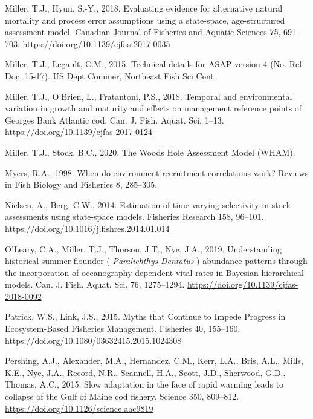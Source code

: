 \documentclass[]{article}
\begin{document}
\leavevmode\hypertarget{ref-miller2018Evaluating}{}%
Miller, T.J., Hyun, S.-Y., 2018. Evaluating evidence for alternative
natural mortality and process error assumptions using a state-space,
age-structured assessment model. Canadian Journal of Fisheries and
Aquatic Sciences 75, 691--703.
\url{https://doi.org/10.1139/cjfas-2017-0035}

\leavevmode\hypertarget{ref-miller2015Technical}{}%
Miller, T.J., Legault, C.M., 2015. Technical details for ASAP version 4
(No. Ref Doc. 15-17). US Dept Commer, Northeast Fish Sci Cent.

\leavevmode\hypertarget{ref-miller2018Temporal}{}%
Miller, T.J., O'Brien, L., Fratantoni, P.S., 2018. Temporal and
environmental variation in growth and maturity and effects on management
reference points of Georges Bank Atlantic cod. Can. J. Fish. Aquat. Sci.
1--13. \url{https://doi.org/10.1139/cjfas-2017-0124}

\leavevmode\hypertarget{ref-miller2020Woods}{}%
Miller, T.J., Stock, B.C., 2020. The Woods Hole Assessment Model (WHAM).

\leavevmode\hypertarget{ref-myers1998When}{}%
Myers, R.A., 1998. When do environment-recruitment correlations work?
Reviews in Fish Biology and Fisheries 8, 285--305.

\leavevmode\hypertarget{ref-nielsen2014Estimation}{}%
Nielsen, A., Berg, C.W., 2014. Estimation of time-varying selectivity in
stock assessments using state-space models. Fisheries Research 158,
96--101. \url{https://doi.org/10.1016/j.fishres.2014.01.014}

\leavevmode\hypertarget{ref-oleary2019Understanding}{}%
O'Leary, C.A., Miller, T.J., Thorson, J.T., Nye, J.A., 2019.
Understanding historical summer flounder ( \emph{Paralichthys}
\emph{Dentatus} ) abundance patterns through the incorporation of
oceanography-dependent vital rates in Bayesian hierarchical models. Can.
J. Fish. Aquat. Sci. 76, 1275--1294.
\url{https://doi.org/10.1139/cjfas-2018-0092}

\leavevmode\hypertarget{ref-patrick2015Myths}{}%
Patrick, W.S., Link, J.S., 2015. Myths that Continue to Impede Progress
in Ecosystem-Based Fisheries Management. Fisheries 40, 155--160.
\url{https://doi.org/10.1080/03632415.2015.1024308}

\leavevmode\hypertarget{ref-pershing2015Slow}{}%
Pershing, A.J., Alexander, M.A., Hernandez, C.M., Kerr, L.A., Bris,
A.L., Mills, K.E., Nye, J.A., Record, N.R., Scannell, H.A., Scott, J.D.,
Sherwood, G.D., Thomas, A.C., 2015. Slow adaptation in the face of rapid
warming leads to collapse of the Gulf of Maine cod fishery. Science 350,
809--812. \url{https://doi.org/10.1126/science.aac9819}
\end{document}
